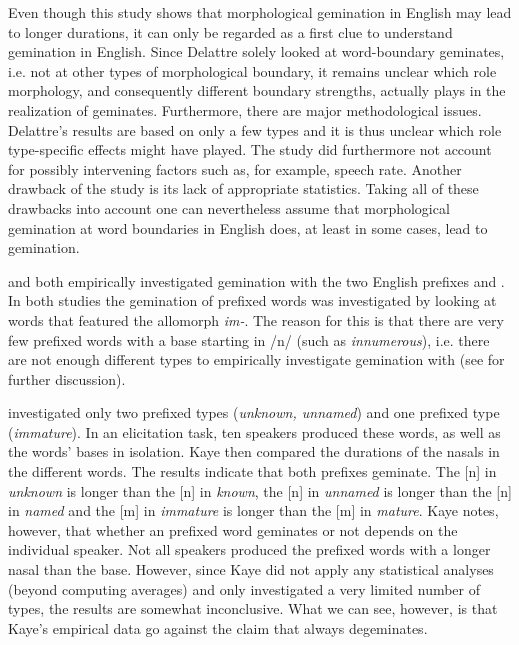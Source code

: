 Even though this study shows that morphological gemination in English may lead to longer durations, it can only be regarded as a first clue to understand gemination in English. Since Delattre solely looked at word-boundary geminates, i.e. not at other types of morphological boundary, it remains unclear which role morphology, and consequently different boundary strengths, actually plays in the realization of geminates. Furthermore, there are major methodological issues. Delattre's results are based on only a few types and it is thus unclear which role type-specific effects might have played. The study did furthermore not account for possibly intervening factors such as, for example, speech rate. Another drawback of the study is its lack of appropriate statistics. Taking all of these drawbacks into account one can nevertheless assume that morphological gemination at word boundaries in English does, at least in some cases, lead to gemination.


\citet{Kaye.2005} and \citet{Oh.2012} both empirically investigated gemination with the two English prefixes  and . In both studies the gemination of prefixed words was investigated by looking at words that featured the allomorph \textit{im-}. The reason for this is that there are very few prefixed words with a base starting in /n/ (such as \textit{innumerous}), i.e. there are not enough different types to empirically investigate gemination with  (see  for further discussion). 


\cite{Kaye.2005} investigated  only two prefixed types (\textit{unknown, unnamed}) and one  prefixed type (\textit{immature}). In an elicitation task, ten speakers produced these words, as well as the words’ bases in isolation. Kaye then compared the durations of the nasals in the different words. The results indicate that both prefixes geminate. The [n] in \textit{unknown} is longer than the [n] in \textit{known},  the [n] in \textit{unnamed} is longer than the [n] in \textit{named} and the [m] in \textit{immature} is longer than the [m] in \textit{mature}. Kaye notes, however, that whether an prefixed word geminates or not depends  on the individual speaker. Not all speakers produced the prefixed words with a longer nasal than the base. However, since Kaye did not apply any statistical analyses (beyond computing averages) and only investigated a very limited number of types, the results are somewhat inconclusive. What we can see, however, is that Kaye's empirical data go against the claim that  always degeminates.


